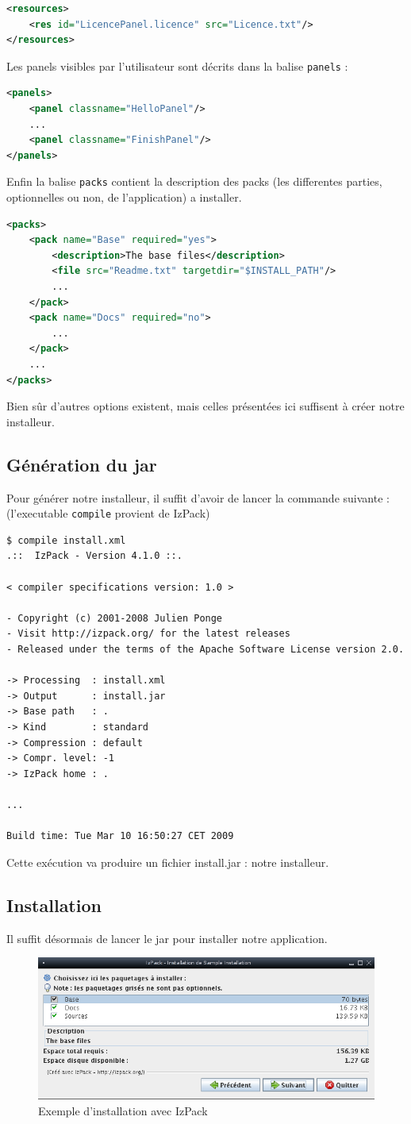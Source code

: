 \begin{lstlisting}[language=xml]
<resources>
	<res id="LicencePanel.licence" src="Licence.txt"/>
</resources>
\end{lstlisting}
Les panels visibles par l'utilisateur sont décrits dans la balise \verb|panels| :
\begin{lstlisting}[language=xml]
<panels>
	<panel classname="HelloPanel"/>
	...
	<panel classname="FinishPanel"/>
</panels>
\end{lstlisting}
Enfin la balise \verb|packs| contient la description des packs (les differentes parties, optionnelles ou non, de l'application) a installer.
\begin{lstlisting}[language=xml]
<packs>
	<pack name="Base" required="yes">
		<description>The base files</description>
		<file src="Readme.txt" targetdir="$INSTALL_PATH"/>
		...
	</pack>
	<pack name="Docs" required="no">
		...
	</pack>
	...
</packs>
\end{lstlisting}
Bien sûr d'autres options existent, mais celles présentées ici suffisent à créer notre installeur.
\subsection{Génération du jar}
Pour générer notre installeur, il suffit d'avoir de lancer la commande suivante : (l'executable \verb|compile| provient de IzPack)
\begin{verbatim}
$ compile install.xml
.::  IzPack - Version 4.1.0 ::.

< compiler specifications version: 1.0 >

- Copyright (c) 2001-2008 Julien Ponge
- Visit http://izpack.org/ for the latest releases
- Released under the terms of the Apache Software License version 2.0.

-> Processing  : install.xml
-> Output      : install.jar
-> Base path   : .
-> Kind        : standard
-> Compression : default
-> Compr. level: -1
-> IzPack home : .

...

Build time: Tue Mar 10 16:50:27 CET 2009
\end{verbatim}
Cette exécution va produire un fichier install.jar : notre installeur.
\subsection{Installation}
Il suffit désormais de lancer le jar pour installer notre application.
\begin{figure}[H]
	\centering
	\includegraphics[width=15cm]{../image/installSample.png}
	\caption{Exemple d'installation avec IzPack}
\end{figure}

